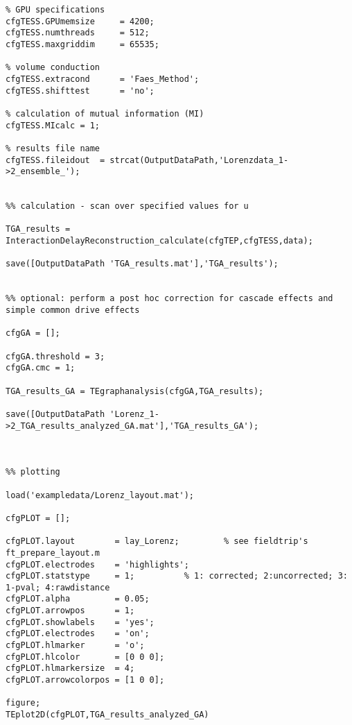 \begin{lstlisting}
% GPU specifications
cfgTESS.GPUmemsize     = 4200;
cfgTESS.numthreads     = 512;
cfgTESS.maxgriddim     = 65535;

% volume conduction
cfgTESS.extracond      = 'Faes_Method';
cfgTESS.shifttest      = 'no';

% calculation of mutual information (MI)
cfgTESS.MIcalc = 1;

% results file name
cfgTESS.fileidout  = strcat(OutputDataPath,'Lorenzdata_1->2_ensemble_');


%% calculation - scan over specified values for u

TGA_results = InteractionDelayReconstruction_calculate(cfgTEP,cfgTESS,data);

save([OutputDataPath 'TGA_results.mat'],'TGA_results');


%% optional: perform a post hoc correction for cascade effects and simple common drive effects

cfgGA = [];

cfgGA.threshold = 3;
cfgGA.cmc = 1;

TGA_results_GA = TEgraphanalysis(cfgGA,TGA_results);

save([OutputDataPath 'Lorenz_1->2_TGA_results_analyzed_GA.mat'],'TGA_results_GA');



%% plotting

load('exampledata/Lorenz_layout.mat');

cfgPLOT = [];

cfgPLOT.layout        = lay_Lorenz; 		% see fieldtrip's ft_prepare_layout.m
cfgPLOT.electrodes    = 'highlights';
cfgPLOT.statstype     = 1;   		% 1: corrected; 2:uncorrected; 3: 1-pval; 4:rawdistance
cfgPLOT.alpha         = 0.05;
cfgPLOT.arrowpos      = 1;
cfgPLOT.showlabels    = 'yes';
cfgPLOT.electrodes    = 'on';
cfgPLOT.hlmarker      = 'o';
cfgPLOT.hlcolor       = [0 0 0];
cfgPLOT.hlmarkersize  = 4;
cfgPLOT.arrowcolorpos = [1 0 0];

figure; 
TEplot2D(cfgPLOT,TGA_results_analyzed_GA)
\end{lstlisting}